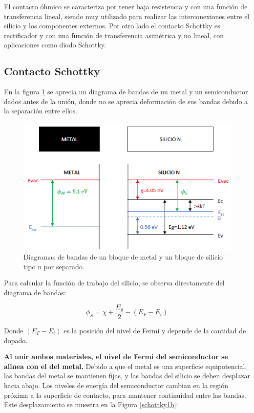 El contacto óhmico se caracteriza por tener baja resistencia y con una función de transferencia lineal, siendo muy utilizado para realizar las interconexiones entre el silicio y los componentes externos. Por otro lado el contacto Schottky es rectificador y con una función de transferencia asimétrica y no lineal, con aplicaciones como diodo Schottky.

\subsection{Contacto Schottky}

En la figura \ref{schottky1a} se aprecia un diagrama de bandas de un metal y un semiconductor dados antes de la unión, donde no se aprecia deformación de sus bandas debido a la separación entre ellos.

\begin{figure}[H]
    \centering
    \includegraphics{figuras/contacto_schottky_1.png}
    \caption{Diagramas de bandas de un bloque de metal y un bloque de silicio tipo n por separado.}
    \label{schottky1a}
\end{figure}

Para calcular la función de trabajo del silicio, se observa directamente del diagrama de bandas:

\[ \phi_S = \chi + \dfrac{E_g}{2} - (E_F - E_i) \]

Donde $(E_F - E_i)$ es la posición del nivel de Fermi y depende de la cantidad de dopado.

\textbf{Al unir ambos materiales, el nivel de Fermi del semiconductor se alinea con el del metal.} Debido a que el metal es una superficie equipotencial, las bandas del metal se mantienen fijas, y las bandas del silicio se deben desplazar hacia abajo. Los niveles de energía del semiconductor cambian en la región próxima a la superficie de contacto, para mantener continuidad entre las bandas. Este desplazamiento se muestra en la Figura \ref{schottky1b}:

